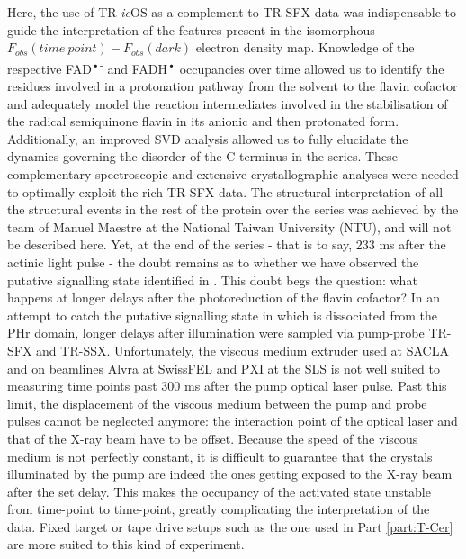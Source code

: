 Here, the use of TR-\textit{ic}OS as a complement to TR-SFX data was indispensable to guide the interpretation of the features present in the isomorphous \(F_{obs}(time\ point) - F_{obs}(dark)\) electron density map. Knowledge of the respective FAD\textsuperscript{•-} and FADH\textsuperscript{•} occupancies over time allowed us to identify the residues involved in a protonation pathway from the solvent to the flavin cofactor and adequately model the reaction intermediates involved in the stabilisation of the radical semiquinone flavin in its anionic and then protonated form. Additionally, an improved SVD analysis allowed us to fully elucidate the dynamics governing the disorder of the C-terminus in the series. These complementary spectroscopic and extensive crystallographic analyses were needed to optimally exploit the rich TR-SFX data. The structural interpretation of all the structural events in the rest of the protein over the series was achieved by the team of Manuel Maestre at the National Taiwan University (NTU), and will not be described here. 
\vspace{2mm}
Yet, at the end of the series - that is to say, 233 ms after the actinic light pulse - the doubt remains as to whether we have observed the putative signalling state identified in \cite{zanglTimeResolvedIonMobility2024}. This doubt begs the question: what happens at longer delays after the photoreduction of the flavin cofactor?
\vspace{2mm}
In an attempt to catch the putative signalling state in which  is dissociated from the PHr domain, longer delays after illumination were sampled via pump-probe TR-SFX and TR-SSX. Unfortunately, the viscous medium extruder used at SACLA and on beamlines Alvra at SwissFEL and PXI at the SLS is not well suited to measuring time points past 300 ms after the pump optical laser pulse. Past this limit, the displacement of the viscous medium between the pump and probe pulses cannot be neglected anymore: the interaction point of the optical laser and that of the X-ray beam have to be offset. Because the speed of the viscous medium is not perfectly constant, it is difficult to guarantee that the crystals illuminated by the pump are indeed the ones getting exposed to the X-ray beam after the set delay. This makes the occupancy of the activated state unstable from time-point to time-point, greatly complicating the interpretation of the data. Fixed target or tape drive setups such as the one used in Part \ref{part:T-Cer} are more suited to this kind of experiment. 
\vspace{2mm}
